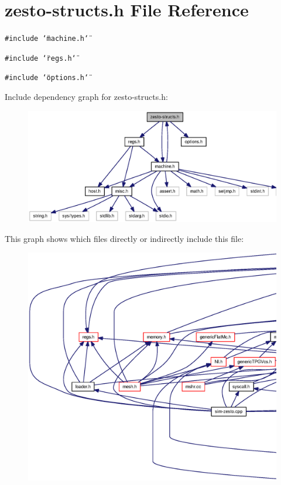 \section{zesto-structs.h File Reference}
\label{zesto-structs_8h}
{\tt \#include \char`\"{}machine.h\char`\"{}}\par
{\tt \#include \char`\"{}regs.h\char`\"{}}\par
{\tt \#include \char`\"{}options.h\char`\"{}}\par


Include dependency graph for zesto-structs.h:\nopagebreak
\begin{figure}[H]
\begin{center}
\leavevmode
\includegraphics[width=333pt]{zesto-structs_8h__incl}
\end{center}
\end{figure}


This graph shows which files directly or indirectly include this file:\nopagebreak
\begin{figure}[H]
\begin{center}
\leavevmode
\includegraphics[width=420pt]{zesto-structs_8h__dep__incl}
\end{center}
\end{figure}
